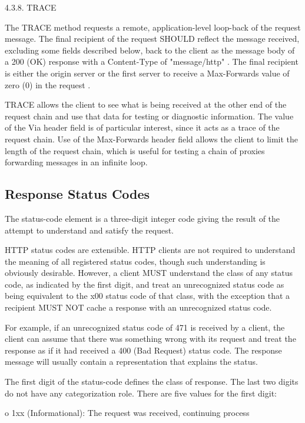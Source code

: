 4.3.8.  TRACE

   The TRACE method requests a remote, application-level loop-back of
   the request message.  The final recipient of the request SHOULD
   reflect the message received, excluding some fields described below,
   back to the client as the message body of a 200 (OK) response with a
   Content-Type of "message/http" .  The
   final recipient is either the origin server or the first server to
   receive a Max-Forwards value of zero (0) in the request
  .

   TRACE allows the client to see what is being received at the other
   end of the request chain and use that data for testing or diagnostic
   information.  The value of the Via header field  is of particular interest, since it acts as a trace of the
   request chain.  Use of the Max-Forwards header field allows the
   client to limit the length of the request chain, which is useful for
   testing a chain of proxies forwarding messages in an infinite loop.



\subsection{Response Status Codes} 
The status-code element is a three-digit integer code giving the
   result of the attempt to understand and satisfy the request.

   HTTP status codes are extensible.  HTTP clients are not required to
   understand the meaning of all registered status codes, though such
   understanding is obviously desirable.  However, a client MUST
   understand the class of any status code, as indicated by the first
   digit, and treat an unrecognized status code as being equivalent to
   the x00 status code of that class, with the exception that a
   recipient MUST NOT cache a response with an unrecognized status code.

   For example, if an unrecognized status code of 471 is received by a
   client, the client can assume that there was something wrong with its
   request and treat the response as if it had received a 400 (Bad
   Request) status code.  The response message will usually contain a
   representation that explains the status.

   The first digit of the status-code defines the class of response.
   The last two digits do not have any categorization role.  There are
   five values for the first digit:

   o  1xx (Informational): The request was received, continuing process

